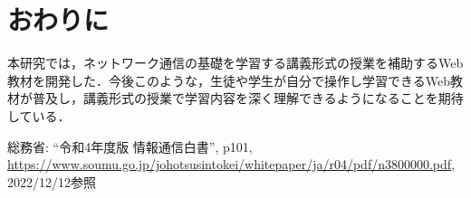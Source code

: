 \documentclass[twocolumn,10pt,a4j]{ltjsarticle}
\begin{document}
\section{おわりに}
本研究では，ネットワーク通信の基礎を学習する講義形式の授業を補助するWeb教材を開発した．今後このような，生徒や学生が自分で操作し学習できるWeb教材が普及し，講義形式の授業で学習内容を深く理解できるようになることを期待している．

\begin{thebibliography}{99}
 総務省: ``令和4年度版 情報通信白書'', p101, \url{https://www.soumu.go.jp/johotsusintokei/whitepaper/ja/r04/pdf/n3800000.pdf}, 2022/12/12参照


\end{thebibliography}
\end{document}
